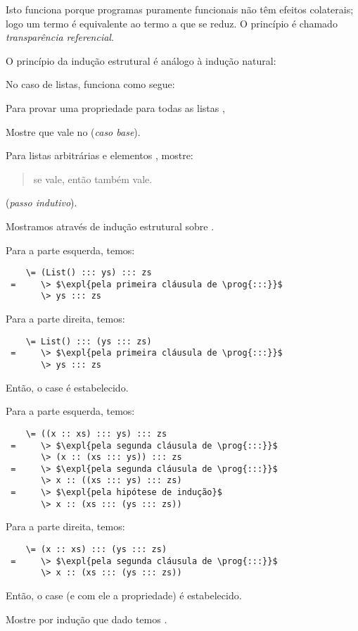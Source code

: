 {Isto funciona porque programas puramente funcionais não têm efeitos colaterais; logo um termo é equivalente 
ao termo a que se reduz.
O princípio é chamado  {\em\emph{transparência referencial}}.

\es
{}

O princípio da indução estrutural é análogo à indução natural:

No caso de listas, funciona como segue:

Para provar uma propriedade  para todas as listas  ,

\be
\item Mostre que  vale no (\emph{caso base}).
\item Para listas arbitrárias  e elementos , mostre: 
\begin{quote}
     se  vale, então  também vale.
\end{quote}
(\emph{passo indutivo}).
\ee

\es
{}

Mostramos  através de indução estrutural sobre .

Para a parte esquerda, temos:
\begin{lstlisting}
    \= (List() ::: ys) ::: zs
 =     \> $\expl{pela primeira cláusula de \prog{:::}}$
       \> ys ::: zs
\end{lstlisting}
Para a parte direita, temos:
\begin{lstlisting}
    \= List() ::: (ys ::: zs)
 =     \> $\expl{pela primeira cláusula de \prog{:::}}$
       \> ys ::: zs
\end{lstlisting}
Então, o case é estabelecido.

\es
\bs
{} 

Para a parte esquerda, temos:
\begin{lstlisting}
    \= ((x :: xs) ::: ys) ::: zs
 =     \> $\expl{pela segunda cláusula de \prog{:::}}$
       \> (x :: (xs ::: ys)) ::: zs
 =     \> $\expl{pela segunda cláusula de \prog{:::}}$
       \> x :: ((xs ::: ys) ::: zs)
 =     \> $\expl{pela hipótese de indução}$
       \> x :: (xs ::: (ys ::: zs))
\end{lstlisting}

Para a parte direita, temos:
\begin{lstlisting}
    \= (x :: xs) ::: (ys ::: zs)
 =     \> $\expl{pela segunda cláusula de \prog{:::}}$
       \> x :: (xs ::: (ys ::: zs))
\end{lstlisting}
Então, o case (e com ele a propriedade) é estabelecido.
\begin{exercise}
Mostre por indu\c{c}\~{a}o que dado  temos . 
\es
{}
\end{exercise}

}
